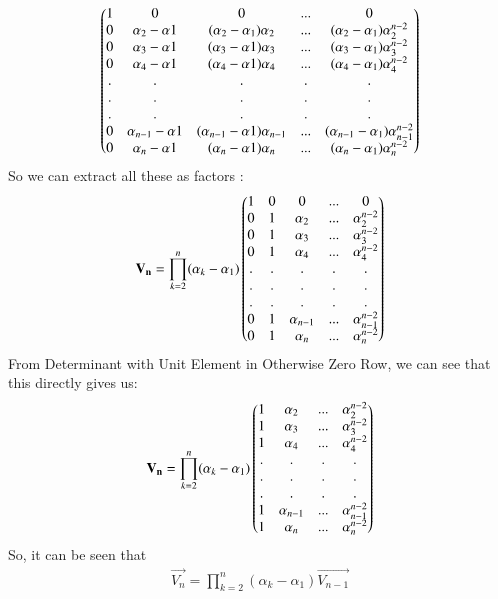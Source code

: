 \documentclass[journal,12pt,twocolumn]{IEEEtran}
\begin{document}
\begin{align}
    \begin{pmatrix}1 & 0 & 0 & ... & 0 \\
    0 & \alpha_2-\alpha1 & (\alpha_2-\alpha_1)\alpha_2 & ... &(\alpha_2-\alpha_1)\alpha_2^{n-2}\\
    0 & \alpha_3-\alpha1 & (\alpha_3-\alpha1)\alpha_3 & ... &(\alpha_3-\alpha_1)\alpha_3^{n-2}\\
    0 & \alpha_4-\alpha1& (\alpha_4-\alpha1)\alpha_4 & ... &(\alpha_4-\alpha_1)\alpha_4^{n-2} \\
    . & . & . & . & . \\
    . & . & . & . & . \\
    . & . & . & . & . \\
    0 & \alpha_{n-1}-\alpha1& (\alpha_{n-1}-\alpha1)\alpha_{n-1} & ... &(\alpha_{n-1}-\alpha_1)\alpha_{n-1}^{n-2}\\
    0 & \alpha_n-\alpha1& (\alpha_n-\alpha1)\alpha_n & ... &(\alpha_n-\alpha_1)\alpha_n^{n-2} 
    \end{pmatrix}
\end{align}
So we can extract all these as factors :
\begin{align}
\mathbf{V_n} = \prod_{k=2}^n(\alpha_k - \alpha_1)
    \begin{pmatrix}1 & 0 & 0 & ... & 0 \\
    0 & 1 & \alpha_2 & ... & \alpha_2^{n-2}\\
    0 & 1 & \alpha_3 & ... & \alpha_3^{n-2}\\
    0 & 1 & \alpha_4 & ... & \alpha_4^{n-2} \\
    . & . & . & . & . \\
    . & . & . & . & . \\
    . & . & . & . & . \\
    0 & 1 & \alpha_{n-1} & ... & \alpha_{n-1}^{n-2}\\
    0 & 1 & \alpha_n & ... & \alpha_n^{n-2} 
    \end{pmatrix}
\end{align}
From Determinant with Unit Element in Otherwise Zero Row, we can see that this directly gives us:
\begin{align}
\mathbf{V_n} = \prod_{k=2}^n(\alpha_k - \alpha_1)
    \begin{pmatrix}
    1 & \alpha_2 & ... & \alpha_2^{n-2}\\
    1 & \alpha_3 & ... & \alpha_3^{n-2}\\
    1 & \alpha_4 & ... & \alpha_4^{n-2} \\
    . & . & . & . \\
    . & . & . & . \\
    . & . & . & . \\
    1 & \alpha_{n-1} & ... & \alpha_{n-1}^{n-2}\\
    1 & \alpha_n & ... & \alpha_n^{n-2} 
    \end{pmatrix}
\end{align}
So, it can be seen that 
\begin{align}
    \vec{V_n} = \prod_{k=2}^n(\alpha_k - \alpha_1)\vec{V_{n-1}}
\end{align}
\end{document}
